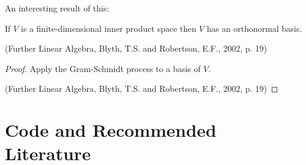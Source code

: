 \documentclass{beamer}
\begin{document}
\begin{frame}
    An interesting result of this:

    \pause
    \begin{corollary}
        If $V$ is a finite-dimensional inner product space then $V$ has an orthonormal basis.

        \par \vspace{3mm} (Further Linear Algebra, Blyth, T.S. and Robertson, E.F., 2002, p. 19)
    \end{corollary}

    \pause
    \begin{proof}
        Apply the Gram-Schmidt process to a basis of $V$.

        \par \vspace{3mm} (Further Linear Algebra, Blyth, T.S. and Robertson, E.F., 2002, p. 19)
    \end{proof}
\end{frame}

\section{Code and Recommended Literature}
\end{document}
